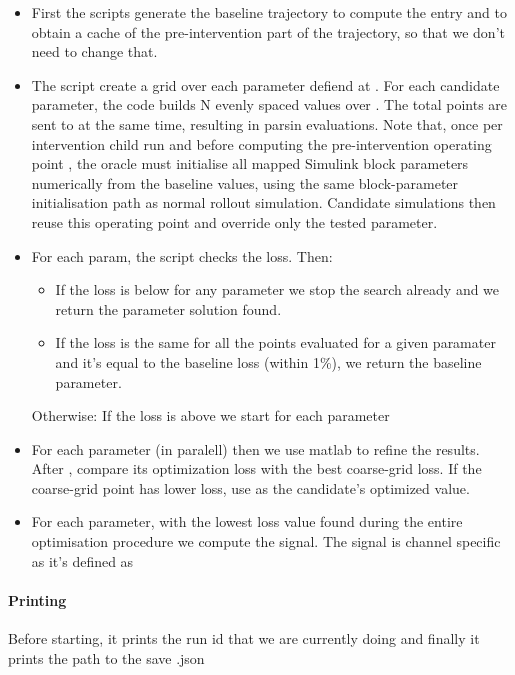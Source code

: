 \documentclass[11pt]{article}
\begin{document}
\begin{itemize}
\item First the scripts generate the baseline trajectory to compute the  entry and to obtain a cache of the pre-intervention part of the trajectory, so that we don't need to change that.
\item The script create a grid over each parameter defiend at .
For each candidate parameter, the code builds N evenly spaced values over .
The total points are sent to  at the same time, resulting in  parsin evaluations.
Note that, once per intervention child run and before computing the pre-intervention operating point , the oracle must initialise all mapped Simulink block parameters numerically from the baseline values, using the same block-parameter initialisation path as normal rollout simulation. Candidate simulations then reuse this operating point and override only the tested parameter.
\item For each param, the script checks the loss. 
Then:
\begin{itemize}
  \item If the loss is below  for any parameter we stop the search already and we return the parameter solution found.
  \item If the loss is the same for all the points evaluated for a given paramater and it's equal to the baseline loss (within 1\%), we return the baseline parameter.
\end{itemize}
Otherwise: If the loss is above we start for each parameter 
\item For each parameter (in paralell) then we use matlab  to refine the results. 
After , compare its optimization loss with the best coarse-grid loss. 
If the coarse-grid point has lower loss, use  as the candidate's optimized value.
\item For each parameter, with the lowest loss value found during the entire optimisation procedure we compute the signal.
The signal is channel specific as it's defined as 
\end{itemize}

\paragraph{Printing} 
Before starting, it prints the run id that we are currently doing and finally it prints the path to the save .json
\end{document}
